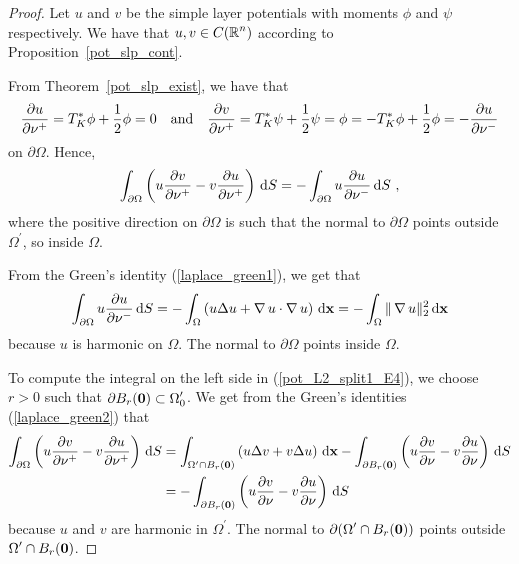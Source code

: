 \begin{proof}
Let $u$ and $v$ be the simple layer potentials with moments $\phi$ and
$\psi$ respectively.    We have that $\displaystyle u,v \in C(\mathbb{R}^n)$
according to Proposition~\ref{pot_slp_cont}.

From Theorem~\ref{pot_slp_exist}, we have that
\[
  \frac{\partial{u}}{\partial \mathbf{\nu}^+} = T^\ast_K \phi + \frac{1}{2} \phi = 0
\quad \text{and} \quad
  \frac{\partial{v}}{\partial \mathbf{\nu}^+} = T^\ast_K \psi + \frac{1}{2} \psi
= \phi = - T^\ast_K \phi + \frac{1}{2} \phi
= - \frac{\partial{u}}{\partial \mathbf{\nu}^-}
\]
on $\partial \Omega$.  Hence,
\begin{equation} \label{pot_L2_split1_E4}
\int_{\partial \Omega} \left( u \frac{\partial{v}}{\partial \mathbf{\nu}^+}
- v \frac{\partial{u}}{\partial \mathbf{\nu}^+} \right) \,\mathrm{d}{S}
= - \int_{\partial \Omega} u \frac{\partial{u}}{\partial \mathbf{\nu}^-} \,\mathrm{d}{S} \ ,
\end{equation}
where the positive direction on $\partial \Omega$ is such that the
normal to $\partial \Omega$ points outside
$\displaystyle \Omega^{\prime}$, so inside $\Omega$.

From the Green's identity (\ref{laplace_green1}), we get that
\begin{equation} \label{pot_L2_split1_E5}
\int_{\partial \Omega} u \frac{\partial{u}}{\partial \mathbf{\nu}^-} \,\mathrm{d}{S} 
= -\int_{\Omega} \left( u \Delta u + \operatorname{\nabla} u \cdot \operatorname{\nabla} u \right)
\,\mathrm{d}{\mathbf{x}}
= -\int_{\Omega} \|\operatorname{\nabla} u\|_2^2 \,\mathrm{d}{\mathbf{x}}
\end{equation}
because $u$ is harmonic on $\Omega$.  The normal to $\partial \Omega$
points inside $\Omega$.

To compute the integral on the left side in (\ref{pot_L2_split1_E4}),
we choose $r>0$ such that
$\displaystyle \partial B_r(\mathbf{0}) \subset \Omega_0^{\prime}$.
We get from the Green's identities (\ref{laplace_green2}) that
\begin{align}
\int_{\partial \Omega} \left( u \frac{\partial{v}}{\partial \mathbf{\nu}^+}
- v \frac{\partial{u}}{\partial \mathbf{\nu}^+} \right) \,\mathrm{d}{S}
&= \int_{\Omega^{\prime} \cap B_r(\mathbf{0})}
\left( u \Delta v + v \Delta u \right) \,\mathrm{d}{\mathbf{x}}
- \int_{\partial B_r(\mathbf{0})} \left( u \frac{\partial{v}}{\partial \mathbf{\nu}}
- v \frac{\partial{u}}{\partial \mathbf{\nu}} \right) \,\mathrm{d}{S}
\nonumber \\
&= - \int_{\partial B_r(\mathbf{0})} \left( u \frac{\partial{v}}{\partial \mathbf{\nu}}
- v \frac{\partial{u}}{\partial \mathbf{\nu}} \right) \,\mathrm{d}{S}
\label{pot_L2_split1_E6}
\end{align}
because $u$ and $v$ are harmonic in $\displaystyle \Omega^{\prime}$.
The normal to $\displaystyle \partial (\Omega^{\prime} \cap B_r(\mathbf{0}))$
points outside $\displaystyle \Omega^{\prime} \cap B_r(\mathbf{0})$.


\end{proof}
